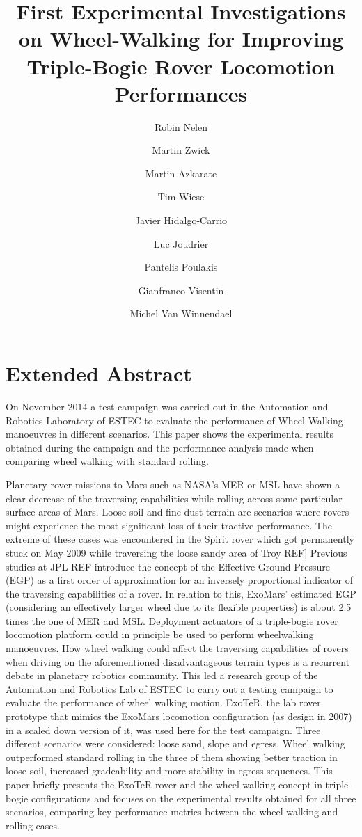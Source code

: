 \documentclass[a4paper,twocolumn]{esapub2005} %
\title{First Experimental Investigations on Wheel-Walking for Improving Triple-Bogie Rover Locomotion Performances}
\author{Robin Nelen}
\author{Martin Zwick}
\author{Martin Azkarate}
\author{Tim Wiese}
\author{Javier Hidalgo-Carrio}
\author{Luc Joudrier}
\author{Pantelis Poulakis}
\author{Gianfranco Visentin}
\author{Michel Van Winnendael}
\affil{European Space Agency, ESA, Noordwijk, The Netherlands}
\affil{Technische Universit\"at M\"unchen, TUM, Munich, Germany}
\affil{Robotics Innovation Center, DFKI, Bremen, Germany}
\begin{document}

\maketitle

\section*{Extended Abstract}
On November 2014 a test campaign was carried out in the Automation and Robotics
Laboratory of ESTEC to evaluate the performance of Wheel Walking manoeuvres in
different scenarios. This paper shows the experimental results obtained during
the campaign and the performance analysis made when comparing wheel walking
with standard rolling.

Planetary rover missions to Mars such as NASA’s MER or MSL have shown a clear
decrease of the traversing capabilities while rolling across some particular
surface areas of Mars. Loose soil and fine dust terrain are scenarios where
rovers might experience the most significant loss of their tractive
performance. The extreme of these cases was encountered in the Spirit rover
which got permanently stuck on May 2009 while traversing the loose sandy area
of Troy REF] Previous studies at JPL REF introduce the concept of the Effective
Ground Pressure (EGP) as a first order of approximation for an inversely
proportional indicator of the traversing capabilities of a rover. In relation
to this, ExoMars’ estimated EGP (considering an effectively larger wheel due to
its flexible properties) is about 2.5 times the one of MER and MSL.  Deployment
actuators of a triple-bogie rover locomotion platform could in principle be
used to perform wheelwalking manoeuvres.  How wheel walking could affect the
traversing capabilities of rovers when driving on the aforementioned
disadvantageous terrain types is a recurrent debate in planetary robotics
community.  This led a research group of the Automation and Robotics Lab of
ESTEC to carry out a testing campaign to evaluate the performance of wheel
walking motion. ExoTeR, the lab rover prototype that mimics the ExoMars
locomotion configuration (as design in 2007) in a scaled down version of it,
was used here for the test campaign. Three different scenarios were considered:
loose sand, slope and egress. Wheel walking outperformed standard rolling in
the three of them showing better traction in loose soil, increased gradeability
and more stability in egress sequences.  This paper briefly presents the ExoTeR
rover and the wheel walking concept in triple-bogie configurations and focuses
on the experimental results obtained for all three scenarios, comparing key
performance metrics between the wheel walking and rolling cases.


\end{document}
